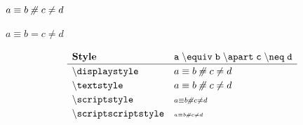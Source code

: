 \documentclass[varwidth, border = 3pt]{standalone}
\newcommand{\simpletest}%
           {a \equiv b \apart c \neq d}
\newcommand{\verbtest}%
           {a \mathmacro{equiv} b \mathmacro{apart} c \mathmacro{neq} d}
\newcommand{\testmathstyle}{
  \[
    \renewcommand{\arraystretch}{1.2}%
    \begin{array}{lll}
        \textbf{Style}
      & \mathtt{\verbtest}
      \\ \hline
        \txtmacro{displaystyle}
      & \displaystyle \simpletest
      \\
        \txtmacro{textstyle}
      & \textstyle \simpletest
      \\
        \txtmacro{scriptstyle}
      & \scriptstyle \simpletest
      \\
        \txtmacro{scriptscriptstyle}
      & \scriptscriptstyle \simpletest
    \end{array}
  \]
}
\begin{document}
$\simpletest$

$a \equiv b = c \neq d$

\testmathstyle
\end{document}
